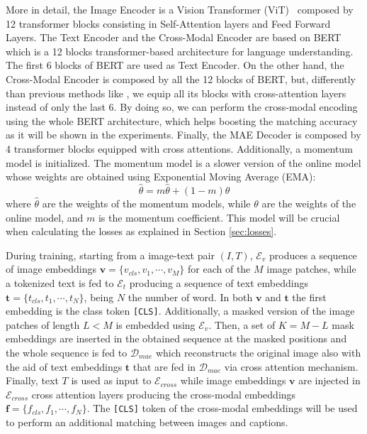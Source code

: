 \documentclass[acmsmall]{acmart}
\begin{document}
More in detail, the Image Encoder is a Vision Transformer (ViT)~\cite{dosovitskiy2020image} composed by 12 transformer blocks consisting in Self-Attention layers and Feed Forward Layers. The Text Encoder and the Cross-Modal Encoder are based on BERT \cite{devlin2018bert} which is a 12 blocks transformer-based architecture for language understanding. The first 6 blocks of BERT are used as Text Encoder. On the other hand, the Cross-Modal Encoder is composed by all the 12 blocks of BERT, but, differently than previous methods like \cite{bai2023rasa, li2021align}, we equip all its blocks with cross-attention layers instead of only the last 6. By doing so, we can perform the cross-modal encoding using the whole BERT architecture, which helps boosting the matching accuracy as it will be shown in the experiments. Finally, the MAE Decoder is composed by 4 transformer blocks equipped with cross attentions. Additionally, a momentum model is initialized. The momentum model is a slower version of the online model whose weights are obtained using Exponential Moving Average (EMA):
\begin{equation}
    \hat{\theta} = m\hat{\theta} + (1-m)\theta
\end{equation}
\noindent where $\hat{\theta}$ are the weights of the momentum models, while $\theta$ are the weights of the online model, and $m$ is the momentum coefficient. This model will be crucial when calculating the losses as explained in Section \ref{sec:losses}. 

During training, starting from a image-text pair $(I,T)$, $\mathcal{E}_v$ produces a sequence of image embeddings $\mathbf{v} = \{v_{cls}, v_1, \cdots, v_M\}$ for each of the $M$ image patches, while a tokenized text is fed to $\mathcal{E}_t$ producing a sequence of text embeddings $\mathbf{t} = \{t_{cls}, t_1, \cdots, t_N\}$, being $N$ the number of word. In both $\mathbf{v}$ and $\mathbf{t}$ the first embedding is the class token \texttt{[CLS]}. Additionally, a masked version of the image patches of length $L<M$ is embedded using $\mathcal{E}_v$. Then, a set of $K = M-L$ mask embeddings are inserted in the obtained sequence at the masked positions and the whole sequence is fed to $\mathcal{D}_{mae}$ which reconstructs the original image also with the aid of text embeddings $\mathbf{t}$ that are fed in $\mathcal{D}_{mae}$ via cross attention mechanism.
Finally, text $T$ is used as input to $\mathcal{E}_{cross}$ while image embeddings $\mathbf{v}$ are injected in $\mathcal{E}_{cross}$ cross attention layers producing the cross-modal embeddings $\mathbf{f} =  \{f_{cls}, f_1, \cdots, f_N\}$. The \texttt{[CLS]} token of the cross-modal embeddings will be used to perform an additional matching between images and captions.
\end{document}

